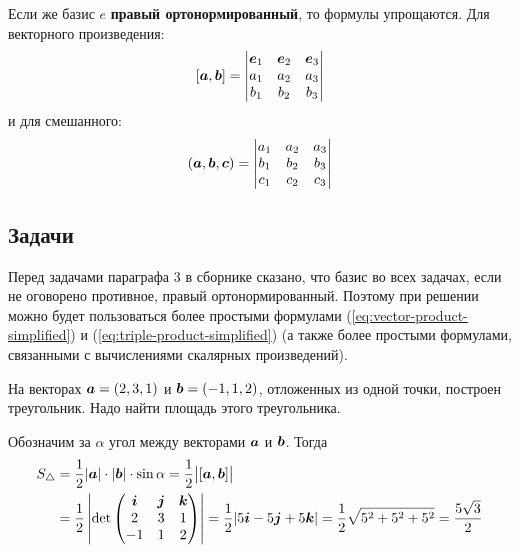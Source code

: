 \documentclass[a4paper,12pt]{article}
\begin{document}
  Если же базис $e$ \textbf{правый ортонормированный}, то формулы упрощаются.
  Для векторного произведения:
  \begin{equation}\label{eq:vector-product-simplified}
    [\boldsymbol a, \boldsymbol b] = \begin{vmatrix}
      \boldsymbol e_1 & \boldsymbol e_2 & \boldsymbol e_3\\
      a_1 & a_2 & a_3\\
      b_1 & b_2 & b_3
    \end{vmatrix}
  \end{equation}
  и для смешанного:
  \begin{equation}\label{eq:triple-product-simplified}
    (\boldsymbol a, \boldsymbol b, \boldsymbol c) = \begin{vmatrix}
      a_1 & a_2 & a_3\\
      b_1 & b_2 & b_3\\
      c_1 & c_2 & c_3
    \end{vmatrix}
  \end{equation}
  
  
  \subsection{Задачи}
  
  Перед задачами параграфа $3$ в сборнике сказано, что базис во всех задачах, если не оговорено противное, правый ортонормированный.
  Поэтому при решении можно будет пользоваться более простыми формулами (\ref{eq:vector-product-simplified}) и (\ref{eq:triple-product-simplified}) (а также более простыми формулами, связанными с вычислениями скалярных произведений).
  
  \begin{problem}[3.8(1)]
    На векторах $\bds a \hm= (2, 3, 1)$ и $\bds b \hm= (-1, 1, 2)$, отложенных из одной точки, построен треугольник.
    Надо найти площадь этого треугольника.
  \end{problem}
  
  \begin{solution}
    Обозначим за $\alpha$ угол между векторами $\boldsymbol a$ и $\boldsymbol b$.
    Тогда
    \begin{equation*}
    \begin{split}
      S_{\triangle} &= \frac{1}{2} |\boldsymbol a| \cdot |\boldsymbol b| \cdot \sin\alpha
      = \frac{1}{2} \bigl| [\boldsymbol a, \boldsymbol b] \bigr|\\
      &= \frac{1}{2} \left| \det \begin{pmatrix}
        \boldsymbol i & \boldsymbol j & \boldsymbol k\\
        2 & 3 & 1\\
        -1 & 1 & 2
      \end{pmatrix} \right|
      = \frac{1}{2} |5 \boldsymbol i - 5 \boldsymbol j + 5 \boldsymbol k|
      = \frac{1}{2} \sqrt{5^2 + 5^2 + 5^2}
      = \frac{5 \sqrt{3}}{2}
    \end{split}
    \end{equation*}
  \end{solution}
  
\end{document}
